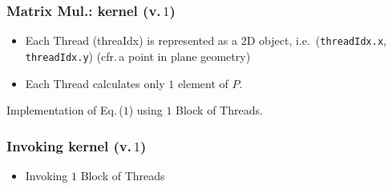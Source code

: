 \begin{frame}
   \frametitle{Matrix Mul.: kernel (v.\,$1$)}
	\begin{itemize}
		\item Each Thread (threaIdx) is represented as a $2$D object, i.e.\, 
		      (\lstinline[style=MyCudaStyle]|threadIdx.x|, \lstinline[style=MyCudaStyle]|threadIdx.y|) 
			(cfr.\,a point in plane geometry)
           \item Each Thread calculates only $1$ element of $P$. 			
        \end{itemize}			
	Implementation of Eq.\,($1$) using $1$ Block of Threads.	
	
\end{frame}

\begin{frame}
	\frametitle{Invoking kernel (v.\,$1$)}
	\begin{itemize}
		\item Invoking $1$ Block of Threads
        
        \end{itemize}			 
\end{frame}


